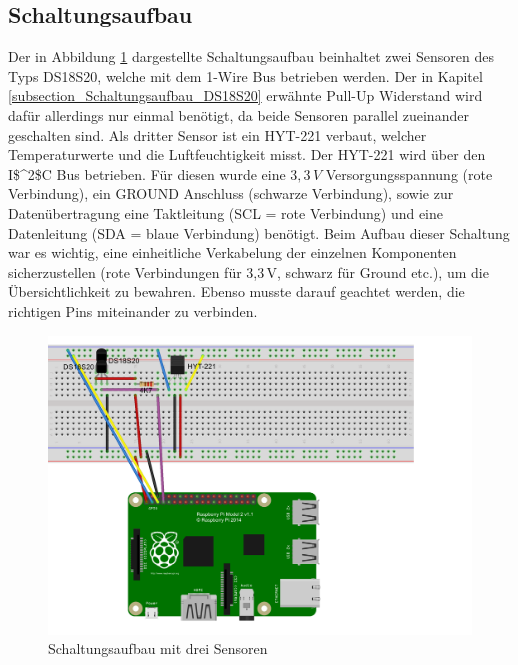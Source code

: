 \subsection{Schaltungsaufbau}
\label{subsection_Schaltungsaufbau_HYT221}
Der in Abbildung \ref{Abb_Schaltungsaufbau_HYT221} dargestellte Schaltungsaufbau beinhaltet zwei Sensoren des Typs DS18S20, welche mit dem 1-Wire Bus betrieben werden. Der in Kapitel \ref{subsection_Schaltungsaufbau_DS18S20} erwähnte Pull-Up Widerstand wird dafür allerdings nur einmal benötigt, da beide Sensoren parallel zueinander geschalten sind. Als dritter Sensor ist ein HYT-221 verbaut, welcher Temperaturwerte und die Luftfeuchtigkeit misst. Der HYT-221 wird über den \ac{I$^2$C} Bus betrieben. Für diesen wurde eine $3,3\,V$ Versorgungsspannung (rote Verbindung), ein GROUND Anschluss (schwarze Verbindung), sowie zur Datenübertragung eine Taktleitung (SCL = rote Verbindung) und eine Datenleitung (SDA = blaue Verbindung) benötigt. Beim Aufbau dieser Schaltung war es wichtig, eine einheitliche Verkabelung der einzelnen Komponenten sicherzustellen (rote Verbindungen für 3,3\,V, schwarz für Ground etc.), um die Übersichtlichkeit zu bewahren. Ebenso musste darauf geachtet werden, die richtigen Pins miteinander zu verbinden.

\begin{figure}[!h] 
  \centering
     \includegraphics[scale=.72]{BilderAllgemein/Schaltung_HYT221.png}
  \caption{Schaltungsaufbau mit drei Sensoren}
  \label{Abb_Schaltungsaufbau_HYT221}
\end{figure}

